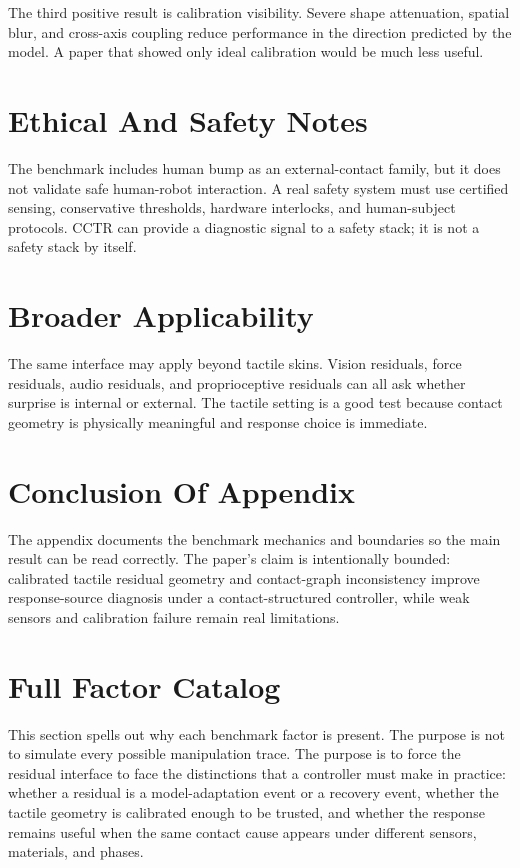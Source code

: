 \documentclass{article}
\newcommand{\method}{CCTR}
\begin{document}
The third positive result is calibration visibility. Severe shape attenuation, spatial blur, and cross-axis coupling reduce performance in the direction predicted by the model. A paper that showed only ideal calibration would be much less useful.

\section{Ethical And Safety Notes}

The benchmark includes human bump as an external-contact family, but it does not validate safe human-robot interaction. A real safety system must use certified sensing, conservative thresholds, hardware interlocks, and human-subject protocols. \method{} can provide a diagnostic signal to a safety stack; it is not a safety stack by itself.

\section{Broader Applicability}

The same interface may apply beyond tactile skins. Vision residuals, force residuals, audio residuals, and proprioceptive residuals can all ask whether surprise is internal or external. The tactile setting is a good test because contact geometry is physically meaningful and response choice is immediate.

\section{Conclusion Of Appendix}

The appendix documents the benchmark mechanics and boundaries so the main result can be read correctly. The paper's claim is intentionally bounded: calibrated tactile residual geometry and contact-graph inconsistency improve response-source diagnosis under a contact-structured controller, while weak sensors and calibration failure remain real limitations.

\clearpage
\section{Full Factor Catalog}

This section spells out why each benchmark factor is present. The purpose is not to simulate every possible manipulation trace. The purpose is to force the residual interface to face the distinctions that a controller must make in practice: whether a residual is a model-adaptation event or a recovery event, whether the tactile geometry is calibrated enough to be trusted, and whether the response remains useful when the same contact cause appears under different sensors, materials, and phases.
\end{document}
